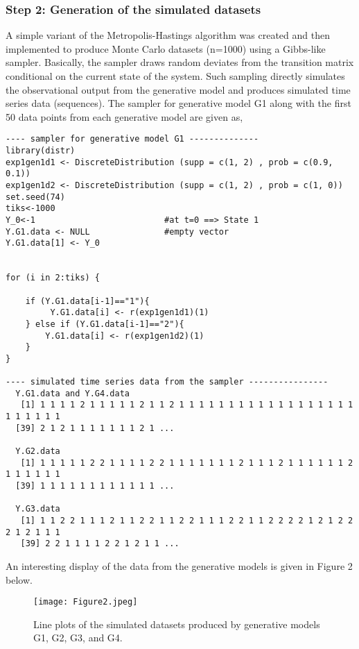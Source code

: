 \documentclass[letter,11pt]{article}
\begin{document}
\subsubsection{Step 2: Generation of the simulated datasets}
A simple variant of the Metropolis-Hastings algorithm was created and then implemented to produce Monte Carlo datasets (n=1000) using a Gibbs-like sampler\cite{hoff_first_2009}\cite{mackay_information_2003}. Basically, the sampler draws random deviates from the transition matrix conditional on the current state of the system. Such sampling directly simulates the observational output from the generative model and produces simulated time series data (sequences). The sampler for generative model G1 along with the first 50 data points from each generative model are given as,
\begin{verbatim}
---- sampler for generative model G1 --------------
library(distr)
exp1gen1d1 <- DiscreteDistribution (supp = c(1, 2) , prob = c(0.9, 0.1))	
exp1gen1d2 <- DiscreteDistribution (supp = c(1, 2) , prob = c(1, 0))		
set.seed(74)
tiks<-1000
Y_0<-1                          #at t=0 ==> State 1
Y.G1.data <- NULL               #empty vector
Y.G1.data[1] <- Y_0


for (i in 2:tiks) {

	if (Y.G1.data[i-1]=="1"){
		 Y.G1.data[i] <- r(exp1gen1d1)(1)
	} else if (Y.G1.data[i-1]=="2"){ 
		Y.G1.data[i] <- r(exp1gen1d2)(1)
	}
}

---- simulated time series data from the sampler ---------------- 
  Y.G1.data and Y.G4.data
   [1] 1 1 1 1 2 1 1 1 1 1 2 1 1 2 1 1 1 1 1 1 1 1 1 1 1 1 1 1 1 1 1 1 1 1 1 1 1 1
  [39] 2 1 2 1 1 1 1 1 1 1 2 1 ...
  
  Y.G2.data
   [1] 1 1 1 1 1 2 2 1 1 1 1 2 2 1 1 1 1 1 1 1 2 1 1 1 2 1 1 1 1 1 1 2 1 1 1 1 1 1
  [39] 1 1 1 1 1 1 1 1 1 1 1 1 ...
  
  Y.G3.data
   [1] 1 1 2 2 1 1 1 2 1 1 2 2 1 1 2 2 1 1 1 2 2 1 1 2 2 2 2 1 2 1 2 2 2 1 2 1 1 1 
   [39] 2 2 1 1 1 1 2 2 1 2 1 1 ...
\end{verbatim}

An interesting display of the data from the generative models is given in Figure 2 below.
\begin{figure}[H]
  \begin{center}
    \texttt{[image: Figure2.jpeg]}
    \label{fig:}
    \caption{Line plots of the simulated datasets produced by generative models G1, G2, G3, and G4.}
  \end{center}
\end{figure}
\end{document}
